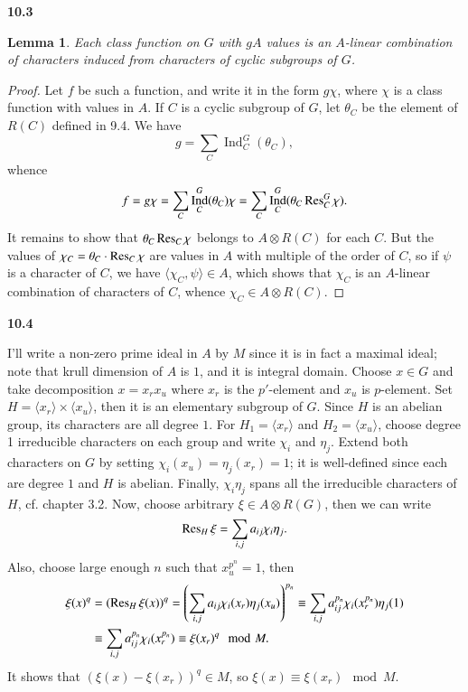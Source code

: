 \documentclass[a4paper, 12pt]{article}
\theoremstyle{Mydefinition}
\theoremstyle{Mytheorem}
\newtheorem{lemma}[statement]{Lemma}
\DeclareMathOperator{\Ind}{Ind}
\begin{document}
\noindent \textbf{10.3}
\begin{lemma}
Each class function on $G$ with $gA$ values is an $A$-linear combination of characters induced from characters of cyclic subgroups of $G$.
\end{lemma}
\begin{proof}
Let $f$ be such a function, and write it in the form $g\chi$, where $\chi$ is a class function with values in $A$. If $C$ is a cyclic subgroup of $G$, let $\theta_C$ be the element of $R(C)$ defined in 9.4. We have
\begin{equation}
    g = \sum_{C}\Ind_C^G(\theta_C),
\end{equation}
whence
\begin{equation}
    f = g\chi = \sum_{C}\Ind_C^G(\theta_C)\chi = \sum_{C}\Ind_C^G(\theta_C \Res_C^G\chi).
\end{equation}
It remains to show that $\theta_C\Res_C\chi$ belongs to $A\otimes R(C)$ for each $C$. But the values of $\chi_C=\theta_C\cdot \Res_C \chi$ are values in $A$ with multiple of the order of $C$, so if $\psi$ is a character of $C$, we have $\langle \chi_C, \psi\rangle \in A$, which shows that $\chi_C$ is an $A$-linear combination of characters of $C$, whence $\chi_C\in A\otimes R(C)$.
\end{proof}

\noindent \textbf{10.4}

I'll write a non-zero prime ideal in $A$ by $M$ since it is in fact a maximal ideal; note that krull dimension of $A$ is $1$, and it is integral domain. Choose $x\in G$ and take decomposition $x=x_rx_u$ where $x_r$ is the $p'$-element and $x_u$ is $p$-element. Set $H = \langle x_r\rangle \times \langle x_u\rangle$, then it is an elementary subgroup of $G$. Since $H$ is an abelian group, its characters are all degree $1$. For $H_1 = \langle x_r\rangle$ and $H_2 = \langle x_u\rangle$, choose degree 1 irreducible characters on each group and write $\chi_i$ and $\eta_j$. Extend both characters on $G$ by setting $\chi_i(x_u)=\eta_j(x_r) = 1$; it is well-defined since each are degree $1$ and $H$ is abelian. Finally, $\chi_i\eta_j$ spans all the irreducible characters of $H$, cf. chapter 3.2. Now, choose arbitrary $\xi\in A\otimes R(G)$, then we can write
\begin{equation}
    \Res_H\xi = \sum_{i,j}a_{ij}\chi_i\eta_j.
\end{equation}
Also, choose large enough $n$ such that $x_u^{p^n} = 1$, then
\begin{equation}
\begin{split}
    \xi(x)^q &= \left(\Res_H\xi(x)\right)^q = \left(\sum_{i,j}a_{ij}\chi_i(x_r)\eta_j(x_u)\right)^{p_n}\equiv \sum_{i,j}a^{p_n}_{ij}\chi_i(x_r^{p_n})\eta_j(1)\\
    &\equiv \sum_{i,j}a^{p_n}_{ij}\chi_i(x_r^{p_n}) \equiv \xi(x_r)^q\mod M.
\end{split}
\end{equation}
It shows that $(\xi(x)-\xi(x_r))^q\in M$, so $\xi(x)\equiv \xi(x_r)\mod M$.\\
\end{document}
